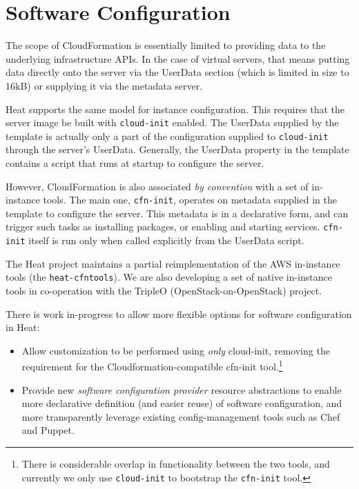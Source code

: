 \section{Software Configuration}

The scope of CloudFormation is essentially limited to providing data to the underlying infrastructure APIs. In the case of virtual servers, that means putting data directly onto the server via the UserData section (which is limited in size to 16kB) or supplying it via the metadata server.

Heat supports the same model for instance configuration.  This requires that the server image be built with \texttt{cloud-init} enabled. The UserData supplied by the template is actually only a part of the configuration supplied to \texttt{cloud-init} through the server's UserData. Generally, the UserData property in the template contains a script that runs at startup to configure the server.

However, CloudFormation is also associated \emph{by convention} with a set of in-instance tools. The main one, \texttt{cfn-init}, operates on metadata supplied in the template to configure the server. This metadata is in a declarative form, and can trigger such tasks as installing packages, or enabling and starting services. \texttt{cfn-init} itself is run only when called explicitly from the UserData script.

The Heat project maintains a partial reimplementation of the AWS in-instance tools (the \texttt{heat-cfntools}). We are also developing a set of native in-instance tools in co-operation with the TripleO (OpenStack-on-OpenStack) project.

There is work in-progress to allow more flexible options for software configuration in Heat:

\begin{itemize}
\item Allow customization to be performed using \emph{only} cloud-init, removing the requirement for the Cloudformation-compatible cfn-init tool.\footnote{There is considerable overlap in functionality between the two tools, and currently we only use \texttt{cloud-init} to bootstrap the \texttt{cfn-init} tool.}
\item Provide new \emph{software configuration provider} resource abstractions to enable more declarative definition (and easier reuse) of software configuration, and more transparently leverage existing config-management tools such as Chef and Puppet.
\end{itemize}
